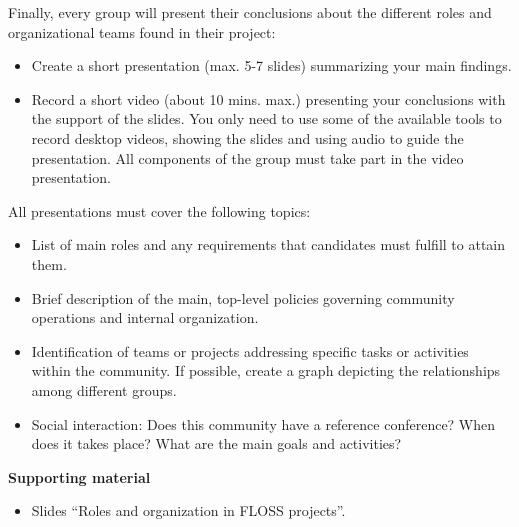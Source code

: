 \documentclass[a4paper]{article}
\begin{document}
Finally, every group will present their conclusions about the different roles 
and organizational teams found in their project:

\begin{itemize}
 \item Create a short presentation (max. 5-7 slides) summarizing your main 
    findings.
 \item Record a short video (about 10 mins. max.) presenting your conclusions 
with the support of the slides. You only need to use some of the available 
tools to record desktop videos, showing the slides and using audio to guide the 
presentation. All components of the group must take part in the video
presentation.

\end{itemize}

All presentations must cover the following topics:

\begin{itemize}
 \item List of main roles and any requirements that candidates must fulfill to 
attain them.
 \item Brief description of the main, top-level policies governing community 
operations and internal organization.
 \item Identification of teams or projects addressing specific tasks or 
activities within the community. If possible, create a graph depicting
the relationships among different groups.
 \item Social interaction: Does this community have a reference conference? 
When does it takes place? What are the main goals and activities?
\end{itemize}

\textbf{Supporting material}

\begin{itemize}
\item Slides ``Roles and organization in FLOSS projects''.
\end{itemize}

% 
% 
% 
\end{document}
